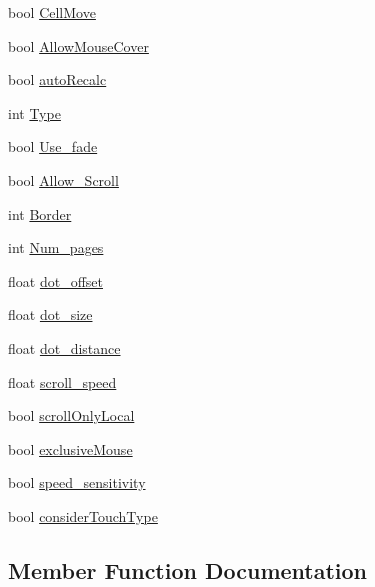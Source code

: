 \begin{DoxyCompactItemize}
bool \hyperlink{class_g_u_i_pager_a36477ef2e8c19ba490ad2ce9997f948b}{Cell\+Move}
\item 
bool \hyperlink{class_g_u_i_pager_abc5e49f96e071d561f24aee46e8f33dc}{Allow\+Mouse\+Cover}
\item 
bool \hyperlink{class_g_u_i_pager_a8748d1ea2b4416d005a573a7a3c5b050}{auto\+Recalc}
\item 
int \hyperlink{class_g_u_i_pager_a6446fa8bb2b3034030165bbe35a436f9}{Type}
\item 
bool \hyperlink{class_g_u_i_pager_aaec2e05c2bffc33ca5ad9d7b7b8499c8}{Use\+\_\+fade}
\item 
bool \hyperlink{class_g_u_i_pager_a87e6855bf35c7112c0ac88c0afa4bd86}{Allow\+\_\+\+Scroll}
\item 
int \hyperlink{class_g_u_i_pager_a55a09c160687ad072f070adb8b1c7058}{Border}
\item 
int \hyperlink{class_g_u_i_pager_a4788e04758121ae1645550f676ad3d9b}{Num\+\_\+pages}
\item 
float \hyperlink{class_g_u_i_pager_a07c6c1263a1eecf7f152c4f01f833d17}{dot\+\_\+offset}
\item 
float \hyperlink{class_g_u_i_pager_a5a34d7907d64059f92735d0243fe456d}{dot\+\_\+size}
\item 
float \hyperlink{class_g_u_i_pager_aa90e62db50d591a20568e5941ea6b71e}{dot\+\_\+distance}
\item 
float \hyperlink{class_g_u_i_pager_a8522009b459f836020f91ac884d7cfb8}{scroll\+\_\+speed}
\item 
bool \hyperlink{class_g_u_i_pager_a0ea084262b9d4ce95acbe0d0f81dd0a6}{scroll\+Only\+Local}
\item 
bool \hyperlink{class_g_u_i_pager_a31cc2c57e2167b84f1792ac50632dbe5}{exclusive\+Mouse}
\item 
bool \hyperlink{class_g_u_i_pager_a5b203994b8dd4ca1497fb993c0bdfcce}{speed\+\_\+sensitivity}
\item 
bool \hyperlink{class_g_u_i_pager_af8341135e576c8373bb020d121875ccc}{consider\+Touch\+Type}
\end{DoxyCompactItemize}


\subsection{Member Function Documentation}
\hypertarget{class_g_u_i_pager_a4a871a0b91470f044db70270c75f666e}{}\label{class_g_u_i_pager_a4a871a0b91470f044db70270c75f666e} 

